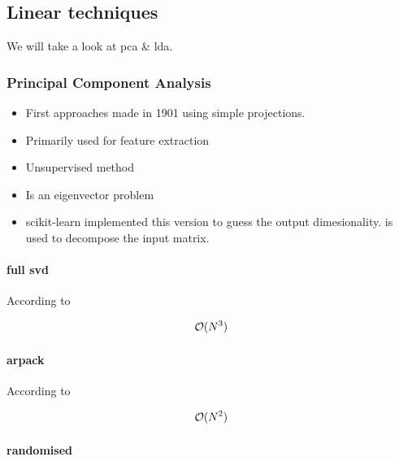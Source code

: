 \clearpage

\subsection{Linear techniques}

We will take a look at \gls{pca} \& \gls{lda}.





\subsubsection{Principal Component Analysis}

\begin{itemize}
	\item First approaches made in 1901 using simple projections. \cite{pearson1901liii}
	\item Primarily used for feature extraction \cite{PythonMachineLearningCh5}
	\item Unsupervised method \cite{PythonMachineLearningCh5}
	\item Is an eigenvector problem \cite{MultilinearSubspaceLearningCh2}
	\item scikit-learn implemented this version \cite{minka2000automatic} to guess the output dimesionality. \cite{halko2009finding} is used to decompose the input matrix.
\end{itemize}

\clearpage

\paragraph{full \gls{svd}} \label{svd}

According to \cite{wright2001large}

$$\mathcal{O}(N^3)$$

\clearpage

\paragraph{\gls{arpack}}

According to \cite{wright2001large}

$$\mathcal{O}(N^2)$$

\clearpage

\paragraph{randomised}


